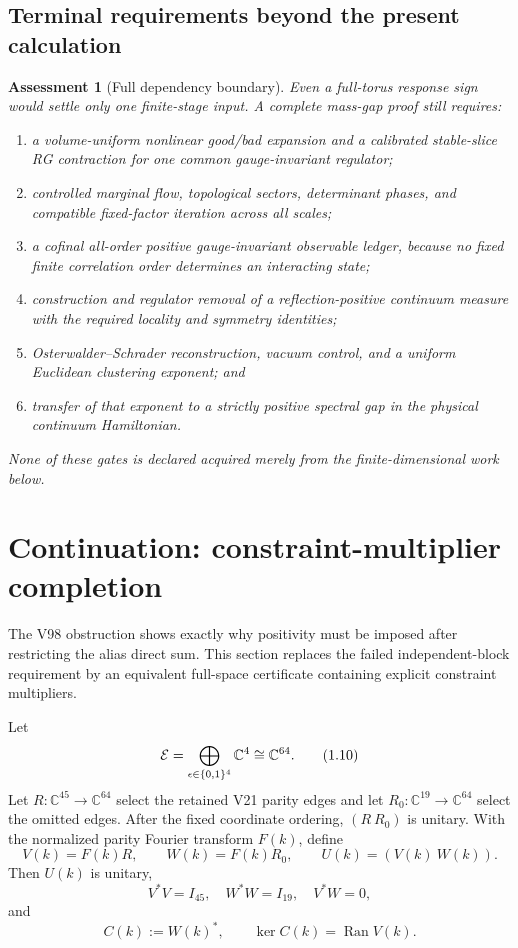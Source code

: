 \documentclass[11pt,oneside]{article}
\newtheorem{assessment}[theorem]{Assessment}
\theoremstyle{definition}
\theoremstyle{remark}
\newcommand{\Ran}{\operatorname{Ran}}
\begin{document}
\subsection{Terminal requirements beyond the present calculation}

\begin{assessment}[Full dependency boundary]
\label{ass:newv1-dependency}
Even a full-torus response sign would settle only one finite-stage
input.  A complete mass-gap proof still requires:
\begin{enumerate}[label=\textup{(\arabic*)},leftmargin=3.3em]
\item a volume-uniform nonlinear good/bad expansion and a calibrated
stable-slice RG contraction for one common gauge-invariant regulator;
\item controlled marginal flow, topological sectors, determinant
phases, and compatible fixed-factor iteration across all scales;
\item a cofinal all-order positive gauge-invariant observable ledger,
because no fixed finite correlation order determines an interacting
state;
\item construction and regulator removal of a reflection-positive
continuum measure with the required locality and symmetry identities;
\item Osterwalder--Schrader reconstruction, vacuum control, and a
uniform Euclidean clustering exponent; and
\item transfer of that exponent to a strictly positive spectral gap
in the physical continuum Hamiltonian.
\end{enumerate}
None of these gates is declared acquired merely from the
finite-dimensional work below.
\end{assessment}

\section{Continuation: constraint-multiplier completion}
\label{sec:newv1-completion}

The V98 obstruction shows exactly why positivity must be imposed
after restricting the alias direct sum.  This section replaces the
failed independent-block requirement by an equivalent full-space
certificate containing explicit constraint multipliers.

Let
\[
 {\cal E}=\bigoplus_{\epsilon\in\{0,1\}^4}\mathbb C^4
 \cong\mathbb C^{64}.                                      \tag{1.10}
\]
Let \(R:\mathbb C^{45}\to\mathbb C^{64}\) select the retained V21
parity edges and let \(R_0:\mathbb C^{19}\to\mathbb C^{64}\)
select the omitted edges.  After the fixed coordinate ordering,
\((R\ R_0)\) is unitary.  With the normalized parity Fourier
transform \(F(k)\), define
\[
 V(k)=F(k)R,\qquad W(k)=F(k)R_0,\qquad
 U(k)=(V(k)\ W(k)).                                        \tag{1.11}
\]
Then \(U(k)\) is unitary,
\[
 V^*V=I_{45},\quad W^*W=I_{19},\quad V^*W=0,               \tag{1.12}
\]
and
\[
 C(k):=W(k)^*,\qquad
 \ker C(k)=\Ran V(k).                                      \tag{1.13}
\]
\end{document}

